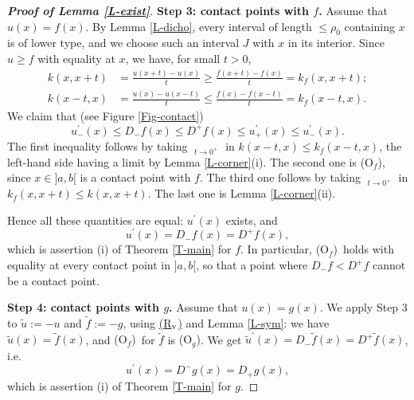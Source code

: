 \documentclass[reqno,12pt]{amsart}
\numberwithin{equation}{section}
\def\limsup{\mathop{\overline{\lim}}}
\def\liminf{\mathop{\underline{\lim}}}
\def\Of{{\sf (O$_f$)}}
\newcommand{\Rv}{\hyperref[HypS1]{{\sf (R$_{\rm v}$)}}}
\def\Og{{\sf (O$_g$)}}
\theoremstyle{remark}
\begin{document}
\begin{proof}[\bf Proof of Lemma \ref{L-exist}]
{\bf Step 3: contact points with \boldmath$f$\unboldmath.} Assume that $u(x)=f(x)$. By Lemma \ref{L-dicho}, every interval of length $\leq\rho_0$ containing $x$ is of lower type, and we choose such an interval $J$ with $x$ in its interior. Since $u\geq f$ with equality at $x$, we have, for small $t>0$,
\begin{align*}
k(x,x+t)&=\frac{u(x+t)-u(x)}t\geq\frac{f(x+t)-f(x)}t=k_f(x,x+t);\\
k(x-t,x)&=\frac{u(x)-u(x-t)}t\leq\frac{f(x)-f(x-t)}t=k_f(x-t,x).
\end{align*}
We claim that (see Figure \ref{Fig-contact})
\begin{equation*}
u^\prime_-(x)\leq D_-f(x)\leq D^+f(x)\leq u^\prime_+(x)\leq u^\prime_-(x).
\end{equation*}
The first inequality follows by taking $\liminf_{t\to0^+}$ in $k(x-t,x)\leq k_f(x-t,x)$, the left-hand side having a limit by Lemma \ref{L-corner}(i). The second one is \Of, since $x\in]a,b[$ is a contact point with $f$. The third one follows by taking $\limsup_{t\to0^+}$ in $k_f(x,x+t)\leq k(x,x+t)$. The last one is Lemma \ref{L-corner}(ii).

\smallskip

Hence all these quantities are equal: $u^\prime(x)$ exists, and
\begin{equation*}
u^\prime(x)=D_-f(x)=D^+f(x),
\end{equation*}
which is assertion (i) of Theorem \ref{T-main} for $f$. In particular, \Of\ holds with equality at every contact point in $]a,b[$, so that a point where $D_-f<D^+f$ cannot be a contact point.

\medskip

{\bf Step 4: contact points with \boldmath$g$\unboldmath.} Assume that $u(x)=g(x)$. We apply Step 3 to $\widetilde u:=-u$ and $\widetilde f:=-g$, using \Rv{} and Lemma \ref{L-sym}: we have $\widetilde u(x)=\widetilde f(x)$, and \Of\ for $\widetilde f$ is \Og. We get $\widetilde u^\prime(x)=D_-\widetilde f(x)=D^+\widetilde f(x)$, i.e.
\begin{equation*}
u^\prime(x)=D^-g(x)=D_+g(x),
\end{equation*}
which is assertion (i) of Theorem \ref{T-main} for $g$.
\end{proof}
\end{document}
